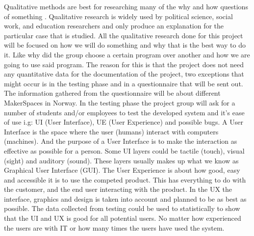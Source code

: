  Qualitative methods are best for researching many of the why and how questions of something \cite{Qualitative-Research}. Qualitative research is widely used by political science, social work, and education researchers and only produce an explanation for the particular case that is studied. All the qualitative research done for this project will be focused on how we will do something and why that is the best way to do it. Like why did the group choose a certain program over another and how we are going to use said program. The reason for this is that the project does not need any quantitative data for the documentation of the project, two exceptions that might occur is in the testing phase and in a questionnaire that will be sent out. The information gathered from the questionnaire will be about different MakerSpaces in Norway. In the testing phase the project group will ask for a number of students and/or employees to test the developed system and it's ease of use i.g: UI (User Interface), UE (User Experience) and possible bugs. A User Interface is the space where the user (humans) interact with computers (machines)\cite{user-interface}. And the purpose of a User Interface is to make the interaction as effective as possible for a person. Some UI layers could be tactile (touch), visual (sight) and auditory (sound). These layers usually makes up what we know as Graphical User Interface (GUI)\cite{GUI}. The User Experience is about how good, easy and accessible it is to use the competed product. This has everything to do with the customer, and the end user interacting with the product. In the UX the interface, graphics and design is taken into account and planned to be as best as possible\cite{UX}.  
 The data collected from testing could be used to statistically to show that the UI and UX is good for all potential users. No matter how experienced the users are with IT or how many times the users have used the system.

